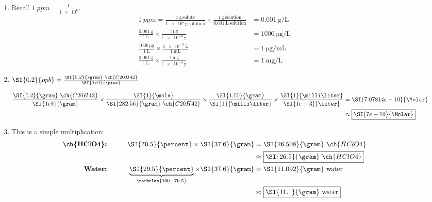 \documentclass{article}
\begin{document}
\begin{enumerate}[start=20,leftmargin=0pt]
	\item Recall $\SI{1}{ppm} = \frac{1}{\num{1e6}}$.
		\begin{align*}
			\SI{1}{ppm} =
			\frac{\SI{1}{\gram}~\text{solute}}{\SI{1e6}{\gram}~\text{solution}} \times \frac{\SI{1}{\gram}~\text{solution}}{\SI{0.001}{\liter}~\text{solution}} &= \boxed{\SI{0.001}{\gram\per\liter}} \\
			\frac{\SI{0.001}{\gram}}{\SI{1}{\liter}} \times 
			\frac{\SI{1}{\micro\gram}}{\SI{1e-6}{\gram}} &= \boxed{\SI{1000}{\micro\gram\per\liter}} \\
			\frac{\SI{1000}{\micro\gram}}{\SI{1}{\liter}} \times
			\frac{\SI{1e-3}{\liter}}{\SI{1}{\milli\liter}} &= \boxed{\SI{1}{\micro\gram\per\milli\liter}} \\
			\frac{\SI{0.001}{\gram}}{\SI{1}{\liter}} \times
			\frac{\SI{1}{\milli\gram}}{\SI{1e-3}{\gram}} &= \boxed{\SI{1}{\milli\gram\per\liter}}
		\end{align*}

	\item $\SI{0.2}{ppb} = \frac{\SI{0.2}{\gram}~\ch{C20H42}}{\SI{1e9}{\gram}}$

		\begin{align*}
			\frac{\SI{0.2}{\gram}~\ch{C20H42}}{\SI{1e9}{\gram}}
			\times
			\frac{\SI{1}{\mole}}{\SI{282.56}{\gram}~\ch{C20H42}}
			\times
			\frac{\SI{1.00}{\gram}}{\SI{1}{\milli\liter}}
			\times
			\frac{\SI{1}{\milli\liter}}{\SI{1e-3}{\liter}} &=
			\SI{7.07814e-10}{\Molar} \\
			&\approx \boxed{\SI{7e-10}{\Molar}}
		\end{align*}

	\item This is a simple multiplication:
		\begin{align*}
			\textbf{\ch{HClO4}:} &\qquad&
			\SI{70.5}{\percent} \times \SI{37.6}{\gram} &= \SI{26.508}{\gram}~\ch{HClO4} \\
			&&&\approx \boxed{\SI{26.5}{\gram}~\ch{HClO4}} \\
			\textbf{Water:} &\qquad&
			\underbrace{\SI{29.5}{\percent}}_{\mathclap{100 - 70.5}} \times \SI{37.6}{\gram} &= \SI{11.092}{\gram}~\text{water} \\
			&&&\approx \boxed{\SI{11.1}{\gram}~\text{water}}
		\end{align*}
\end{enumerate}
\end{document}
